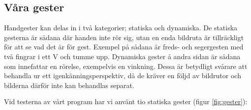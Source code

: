 \documentclass[../rapport_MVEX01-11-05]{subfiles}
\begin{document}
\subsection{Våra gester}
Handgester kan delas in i två kategorier; statiska och dynamiska. De
statiska gesterna är sådana där handen inte rör sig, utan en enda
bildruta är tillräckligt för att se vad det är för gest. Exempel på
sådana är freds- och segergesten med två fingrar i ett V och tumme
upp. Dynamiska gester å andra sidan är sådana som innefattar en
rörelse, exempelvis en vinkning. Dessa är betydligt svårare att
behandla ur ett igenkänningsperspektiv, då de kräver en följd av
bildrutor och bilderna därför inte kan behandlas separat.

Vid testerna av vårt program har vi använt tio statiska gester (figur
\ref{fig:gester}):
\end{document}

